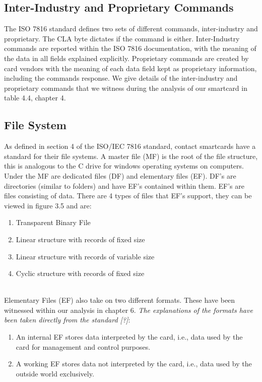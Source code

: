 \documentclass[bsc,frontabs,twoside,singlespacing,parskip,deptreport]{infthesis}     %
\begin{document}
\subsection{Inter-Industry and Proprietary Commands}
The ISO 7816 standard defines two sets of different commands, inter-industry and proprietary. The CLA byte dictates if the command is either. Inter-Industry commands are reported within the ISO 7816 documentation, with the meaning of the data in all fields explained explicitly. Proprietary commands are created by card vendors with the meaning of each data field kept as proprietary information, including the commands response. We give details of the inter-industry and proprietary commands that we witness during the analysis of our smartcard in table 4.4, chapter 4.

\subsection{File System}

As defined in section 4 of the ISO/IEC 7816 standard, contact smartcards have a standard for their file systems. A master file (MF) is the root of the file structure, this is analogous to the C drive for windows operating systems on computers. Under the MF are dedicated files (DF) and elementary files (EF). DF's are directories (similar to folders) and have EF's contained within them. EF's are files consisting of data. There are 4 types of files that EF's support, they can be viewed in figure 3.5 and are:
\begin{enumerate}
\item Transparent Binary File
\item Linear structure with records of fixed size
\item Linear structure with records of variable size
\item Cyclic structure with records of fixed size\\\\
\end{enumerate}

Elementary Files (EF) also take on two different formats. These have been witnessed within our analysis in chapter 6. \textit{The explanations of the formats have been taken directly from the standard [?]}:
\begin{enumerate}
\item An internal EF stores data interpreted by the card, i.e., data used by the card for management and
control purposes.
\item A working EF stores data not interpreted by the card, i.e., data used by the outside world exclusively.
\end{enumerate}
\end{document}
